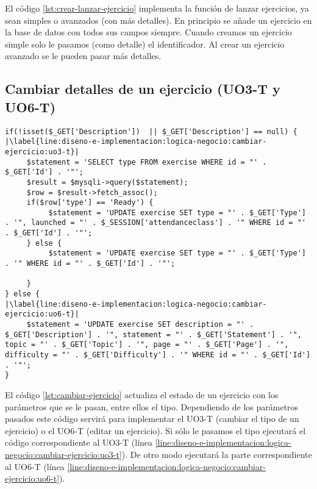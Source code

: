 El código \ref{lst:crear-lanzar-ejercicio} implementa la función de lanzar ejercicios, ya sean simples o avanzados (con más detalles). En principio se añade un ejercicio en la base de datos con todos sus campos siempre. Cuando creamos un ejercicio simple solo le pasamos (como detalle) el identificador. Al crear un ejercicio avanzado se le pueden pasar más detalles.\\

\subsection{Cambiar detalles de un ejercicio (UO3-T y UO6-T)}
\label{diseno-e-implementacion:logica-negocio:cambiar-ejercicio}

\noindent
\begin{lstlisting}[caption=Cambiar el tipo de un ejercicio.,label={lst:cambiar-ejercicio}]
if(!isset($_GET['Description'])  || $_GET['Description'] == null) {
|\label{line:diseno-e-implementacion:logica-negocio:cambiar-ejercicio:uo3-t}|
     $statement = 'SELECT type FROM exercise WHERE id = "' . $_GET['Id'] . '"';
     $result = $mysqli->query($statement);
     $row = $result->fetch_assoc();
     if($row['type'] == 'Ready') {
          $statement = 'UPDATE exercise SET type = "' . $_GET['Type'] . '", launched = "' . $_SESSION['attendanceclass'] . '" WHERE id = "' . $_GET['Id'] . '"';
     } else {
          $statement = 'UPDATE exercise SET type = "' . $_GET['Type'] . '" WHERE id = "' . $_GET['Id'] . '"';

     }
} else {
|\label{line:diseno-e-implementacion:logica-negocio:cambiar-ejercicio:uo6-t}|
     $statement = 'UPDATE exercise SET description = "' . $_GET['Description'] . '", statement = "' . $_GET['Statement'] . '", topic = "' . $_GET['Topic'] . '", page = "' . $_GET['Page'] . '", difficulty = "' . $_GET['Difficulty'] . '" WHERE id = "' . $_GET['Id'] . '"';
}
\end{lstlisting}

 El código \ref{lst:cambiar-ejercicio} actualiza el estado de un ejercicio con los parámetros que se le pasan, entre ellos el tipo. Dependiendo de los parámetros pasados este código servirá para implementar el UO3-T (cambiar el tipo de un ejercicio) o el UO6-T (editar un ejercicio). Si sólo le pasamos el tipo ejecutará el código correspondiente al UO3-T (línea \ref{line:diseno-e-implementacion:logica-negocio:cambiar-ejercicio:uo3-t}). De otro modo ejecutará la parte correspondiente al UO6-T (línea \ref{line:diseno-e-implementacion:logica-negocio:cambiar-ejercicio:uo6-t}).
 
